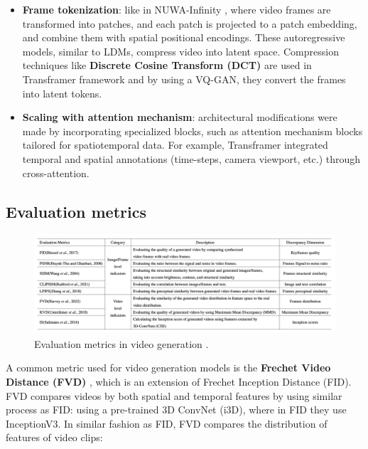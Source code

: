 \begin{itemize}
    \item \textbf{Frame tokenization}: like in NUWA-Infinity \cite{nuwa_infinity}, where video frames are transformed into patches, and each patch is projected to a patch embedding, and combine them with spatial positional encodings. These autoregressive models, similar to LDMs, compress video into latent space. Compression techniques like \textbf{Discrete Cosine Transform (DCT)} are used in Transframer \cite{transframer} framework and by using a VQ-GAN, they convert the frames into latent tokens.
    \item \textbf{Scaling with attention mechanism}: architectural modifications were made by incorporating specialized blocks, such as attention mechanism blocks tailored for spatiotemporal data. For example, Transframer \cite{transframer} integrated temporal and spatial annotations (time-steps, camera viewport, etc.) through cross-attention.
\end{itemize}















\subsection{Evaluation metrics}

\begin{figure}
    \centering
    \includegraphics[width=1\textwidth]{images/video_synthesis/eval_metrics.png}
    \caption{Evaluation metrics in video generation \cite{long_video_survey}.}
    \label{fig:video_synthesis_eval_metrics}
\end{figure}

A common metric used for video generation models is the \textbf{Frechet Video Distance (FVD)} \cite{fvd}, which is an extension of Frechet Inception Distance (FID). FVD compares videos by both spatial and temporal features by using similar process as FID: using a pre-trained 3D ConvNet (i3D), where in FID they use InceptionV3. In similar fashion as FID, FVD compares the distribution of features of video clips:

